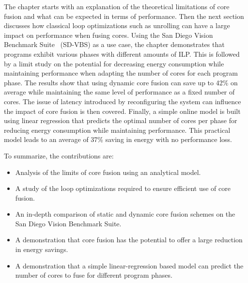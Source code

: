 The chapter starts with an explanation of the theoretical limitations of core fusion and what can be expected in terms of performance.
Then the next section discusses how classical loop optimizations such as unrolling can have a large impact on performance when fusing cores.
Using the San Diego Vision Benchmark Suite~\cite{sdvbs} (SD-VBS) as a use case, the chapter demonstrates that programs exhibit various phases with different amounts of ILP.
This is followed by a limit study on the potential for decreasing energy consumption while maintaining performance when adapting the number of cores for each program phase.
The results show that using dynamic core fusion can save up to 42\% on average while maintaining the same level of performance as a fixed number of cores.
The issue of latency introduced by reconfiguring the system can influence the impact of core fusion is then covered.
Finally, a simple online model is built using linear regression that predicts the optimal number of cores per phase for reducing energy consumption while maintaining performance.
This practical model leads to an average of 37\% saving in energy with no performance loss.

To summarize, the contributions are:

\begin{itemize}
\item Analysis of the limits of core fusion using an analytical model.
\item A study of the loop optimizations required to ensure efficient use of core fusion.
\item An in-depth comparison of static and dynamic core fusion schemes on the San Diego Vision Benchmark Suite.
\item A demonstration that core fusion has the potential to offer a large reduction in energy savings.
\item A demonstration that a simple linear-regression based model can predict the number of cores to fuse for different program phases.
\end{itemize}

